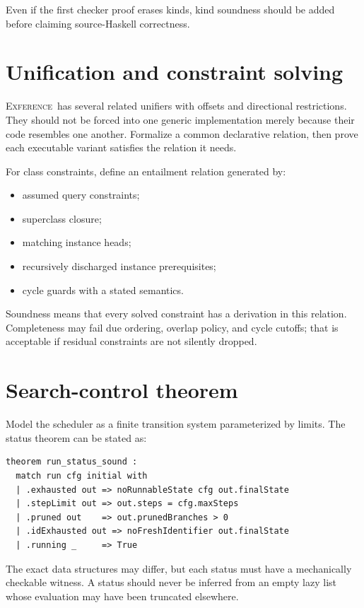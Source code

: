 \documentclass[11pt,letterpaper,openany]{report}
\theoremstyle{definition}
\theoremstyle{remark}
\newcommand{\Exference}{\textsc{Exference}}
\begin{document}
Even if the first checker proof erases kinds, kind soundness should be added before claiming source-Haskell correctness.

\section{Unification and constraint solving}

\Exference\ has several related unifiers with offsets and directional restrictions. They should not be forced into one generic implementation merely because their code resembles one another. Formalize a common declarative relation, then prove each executable variant satisfies the relation it needs.

For class constraints, define an entailment relation generated by:

\begin{itemize}
\item assumed query constraints;
\item superclass closure;
\item matching instance heads;
\item recursively discharged instance prerequisites;
\item cycle guards with a stated semantics.
\end{itemize}

Soundness means that every solved constraint has a derivation in this relation. Completeness may fail due ordering, overlap policy, and cycle cutoffs; that is acceptable if residual constraints are not silently dropped.

\section{Search-control theorem}

Model the scheduler as a finite transition system parameterized by limits. The status theorem can be stated as:

\begin{lstlisting}[language=LeanFour,caption={Operational status honesty.}]
theorem run_status_sound :
  match run cfg initial with
  | .exhausted out => noRunnableState cfg out.finalState
  | .stepLimit out => out.steps = cfg.maxSteps
  | .pruned out    => out.prunedBranches > 0
  | .idExhausted out => noFreshIdentifier out.finalState
  | .running _     => True
\end{lstlisting}

The exact data structures may differ, but each status must have a mechanically checkable witness. A status should never be inferred from an empty lazy list whose evaluation may have been truncated elsewhere.
\end{document}
